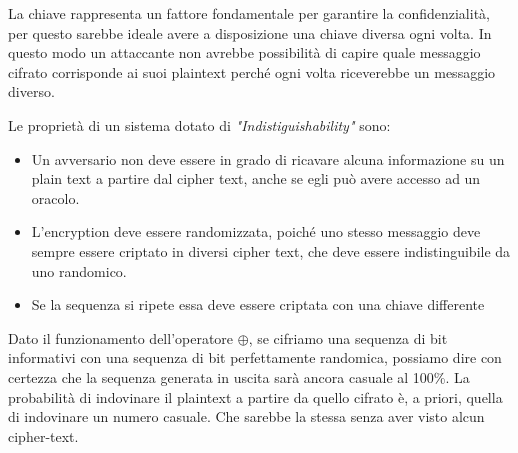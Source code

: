 \begin{remark}
La chiave rappresenta un fattore fondamentale per garantire la confidenzialità, per questo sarebbe ideale avere a disposizione una chiave diversa ogni volta. In questo modo un attaccante non avrebbe possibilità di capire quale messaggio cifrato corrisponde ai suoi plaintext perché ogni volta riceverebbe un messaggio diverso.
\end{remark}
Le proprietà di un sistema dotato di \textit{"Indistiguishability"} sono:
\begin{itemize}
    \item Un avversario non deve essere in grado di ricavare alcuna informazione su un plain text a partire dal cipher text, anche se egli può avere accesso ad un oracolo.  
    \item L’encryption deve essere randomizzata, poiché uno stesso messaggio deve sempre essere criptato in diversi cipher text, che deve essere indistinguibile da uno randomico. 
    \item Se la sequenza si ripete essa deve essere criptata con una chiave differente
\end{itemize}
\begin{corollary}
Dato il funzionamento dell'operatore $\oplus$, se cifriamo una sequenza di bit informativi con una sequenza di bit perfettamente randomica, possiamo dire con certezza che la sequenza generata in uscita sarà ancora casuale al 100\%. La probabilità di indovinare il plaintext a partire da quello cifrato è, a priori, quella di indovinare un numero casuale. Che sarebbe la stessa senza aver visto alcun cipher-text.
\end{corollary}
